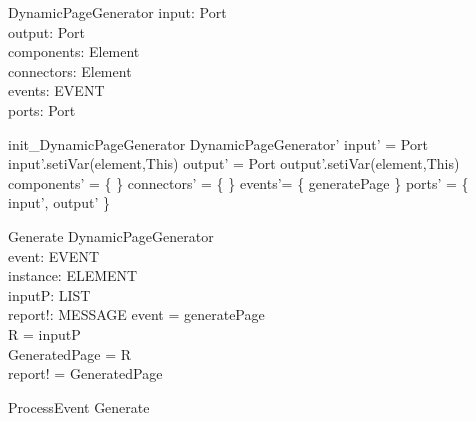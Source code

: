 \begin{schema}{DynamicPageGenerator}
input:  Port \\
output: Port \\
components: \pset Element \\
connectors: \pset Element \\
events: \pset EVENT \\
ports: \pset Port 
\end{schema}


\begin{zed}
init\_DynamicPageGenerator \sdef \lsch DynamicPageGenerator' \bbar input' = \new Port \land input'.setiVar(element,This) \land output' = \new Port \land output'.setiVar(element,This) \land components' = \{ \} \land  connectors' = \{ \} \land events'= \{ generatePage \}  \land ports' = \{ input', output'   \} \rsch  \end{zed}

\begin{schema}{Generate}
\Delta DynamicPageGenerator \\
event: EVENT \\
instance: ELEMENT \\
inputP: LIST \\
report!: MESSAGE
\where event = generatePage \\ 
R = \head inputP \\
GeneratedPage = R \\
report! = GeneratedPage 
\end{schema}


\begin{zed} ProcessEvent \sdef Generate
\end{zed}
